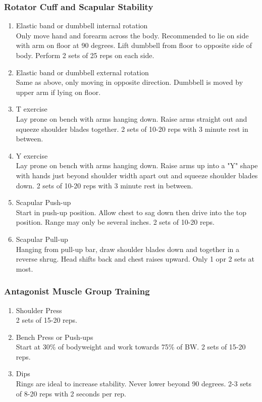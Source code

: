 \documentclass[12pt, letterpaper]{article}
\begin{document}
\subsubsection{Rotator Cuff and Scapular Stability}

\begin{enumerate}
    \item Elastic band or dumbbell internal rotation \\ Only move hand and forearm across the body. Recommended to lie on side with arm on floor at 90 degrees. Lift dumbbell from floor to opposite side of body. Perform 2 sets of 25 reps on each side.
    \item Elastic band or dumbbell external rotation \\ Same as above, only moving in opposite direction. Dumbbell is moved by upper arm if lying on floor.
    \item T exercise \\ Lay prone on bench with arms hanging down. Raise arms straight out and squeeze shoulder blades together. 2 sets of 10-20 reps with 3 minute rest in between.
    \item Y exercise \\ Lay prone on bench with arms hanging down. Raise arms up into a "Y" shape with hands just beyond shoulder width apart out and squeeze shoulder blades down. 2 sets of 10-20 reps with 3 minute rest in between.
    \item Scapular Push-up \\ Start in push-up position. Allow chest to sag down then drive into the top position. Range may only be several inches. 2 sets of 10-20 reps.
    \item Scapular Pull-up \\ Hanging from pull-up bar, draw shoulder blades down and together in a reverse shrug. Head shifts back and chest raises upward. Only 1 opr 2 sets at most.
\end{enumerate}

\subsubsection{Antagonist Muscle Group Training}

\begin{enumerate}
    \item Shoulder Press \\ 2 sets of 15-20 reps.
    \item Bench Press or Push-ups \\ Start at 30\% of bodyweight and work towards 75\% of BW. 2 sets of 15-20 reps.
    \item Dips \\ Rings are ideal to increase stability. Never lower beyond 90 degrees. 2-3 sets of 8-20 reps with 2 seconds per rep.
\end{enumerate}
    
\end{document}
